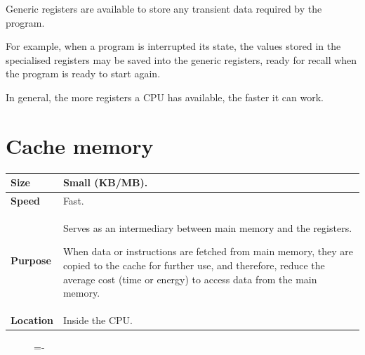 \documentclass[a4paper]{systems-software}
\begin{document}
Generic registers are available to store any transient data required by the program.

For example, when a program is interrupted its state, the values stored in the specialised registers may be saved into the generic registers, ready for recall when the program is ready to start again.

In general, the more registers a CPU has available, the faster it can work.


\section*{Cache memory}

\begin{longtabu} to \textwidth {| X[1,l] | X[6,l] |}
    \hline
    \textbf{Size} & Small (KB/MB).
	\\ \hline
	\textbf{Speed} & Fast.
	\\ \hline
	\textbf{Purpose} & Serves as an intermediary between main memory and the registers.
	
	When data or instructions are fetched from main memory, they are copied to the cache for further use, and therefore, reduce the average cost (time or energy) to access data from the main memory.
	\\ \hline
	\textbf{Location} & Inside the CPU.
	\\ \hline
\end{longtabu}

\begin{figure}[H]
  \lineskip=-\fboxrule
\end{figure}
\end{document}
